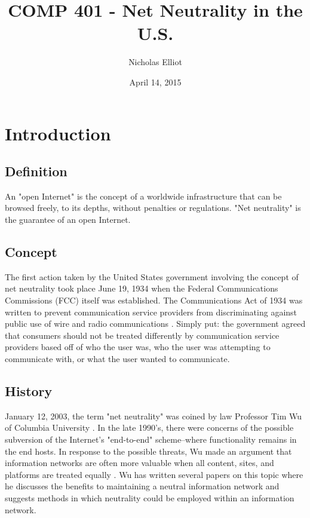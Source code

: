 \documentclass[11pt]{article}
\begin{document}
\title{COMP 401 - Net Neutrality in the U.S.}
\author{Nicholas Elliot}
\date{April 14, 2015}
\maketitle


\section{Introduction}
\subsection{Definition}
An "open Internet" is the concept of a worldwide infrastructure that can be browsed freely, to its depths, without penalties or regulations.  "Net neutrality" is the guarantee of an open Internet.

\subsection{Concept}
The first action taken by the United States government involving the concept of net neutrality took place June 19, 1934 when the Federal Communications Commissions (FCC) itself was established.  The Communications Act of 1934 was written to prevent communication service providers from discriminating against public use of wire and radio communications \cite{ComAct}.  Simply put: the government agreed that consumers should not be treated differently by communication service providers based off of who the user was, who the user was attempting to communicate with, or what the user wanted to communicate.

\subsection{History}
January 12, 2003, the term "net neutrality" was coined by law Professor Tim Wu of Columbia University \cite{ComAct}.  In the late 1990's, there were concerns of the possible subversion of the Internet's "end-to-end" scheme--where functionality remains in the end hosts.  In response to the possible threats, Wu made an argument that information networks are often more valuable when all content, sites, and platforms are treated equally \cite{Wu}.  Wu has written several papers on this topic where he discusses the benefits to maintaining a neutral information network and suggests methods in which neutrality could be employed within an information network.
\end{document}
